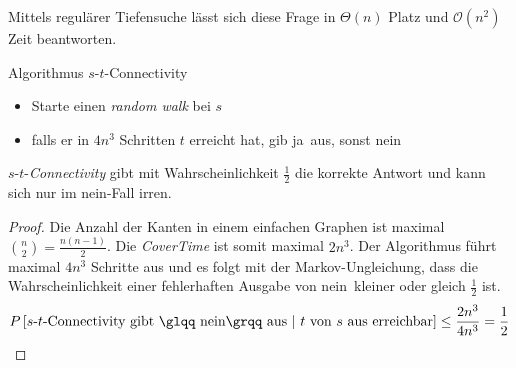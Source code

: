 Mittels regulärer Tiefensuche lässt sich diese Frage in $\Theta(n)$ Platz und
$\mathcal{O}(n^2)$ Zeit beantworten.
\begin{algorithm}[H]
	\caption{Algorithmus $s$-$t$-Connectivity}
	\vspace{0.4cm}
	\begin{itemize}
		\setlength{\itemsep}{2pt}
		\setlength{\parskip}{2pt}
		\setlength{\parsep}{2pt}
		\item Starte einen \emph{random walk} bei $s$
		\item falls er in $4n^3$ Schritten $t$ erreicht hat, gib \glqq
			ja\grqq\ aus, sonst \glqq nein\grqq
	\end{itemize}
\end{algorithm}
\begin{satz}
	$s$-$t$-\emph{Connectivity} gibt mit Wahrscheinlichkeit $\frac{1}{2}$
	die korrekte Antwort und kann sich nur im \glqq nein\grqq-Fall irren.
\end{satz}
\begin{proof}
	Die Anzahl der Kanten in einem einfachen Graphen ist maximal
	$\binom{n}{2} = \frac{n(n-1)}{2}$. Die \emph{CoverTime} ist somit
	maximal $2n^3$. Der Algorithmus führt maximal $4n^3$ Schritte aus und
	es folgt mit der Markov-Ungleichung, dass die Wahrscheinlichkeit einer
	fehlerhaften Ausgabe von \glqq nein\grqq\ kleiner oder gleich
	$\frac{1}{2}$ ist.
	\[
	  P\left[\text{$s$-$t$-Connectivity gibt \glqq nein\grqq\ aus}\ |\ 
	  \text{$t$ von $s$ aus erreichbar}\right] \leq \frac{2n^3}{4n^3} =
	  \frac{1}{2}
	\]
\end{proof}
